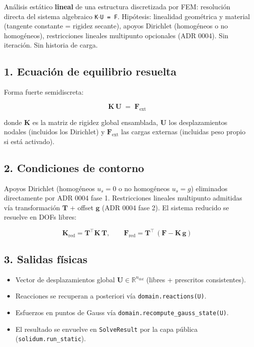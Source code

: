 \documentclass[11pt,letterpaper,oneside]{report}
\begin{document}
Análisis estático \textbf{lineal} de una estructura discretizada por FEM: resolución directa del sistema algebraico \texttt{K\ensuremath{\cdot}U = F}. Hipótesis: linealidad geométrica y material (tangente constante = rigidez secante), apoyos Dirichlet (homogéneos o no homogéneos), restricciones lineales multipunto opcionales (ADR 0004). Sin iteración. Sin historia de carga.

\subsection{1. Ecuación de equilibrio resuelta}

Forma fuerte semidiscreta:

\[
\mathbf K\,\mathbf U \;=\; \mathbf F_{\text{ext}}
\]

donde $\mathbf K$ es la matriz de rigidez global ensamblada, $\mathbf U$ los desplazamientos nodales (incluidos los Dirichlet) y $\mathbf F_{\text{ext}}$ las cargas externas (incluidas peso propio si está activado).

\subsection{2. Condiciones de contorno}

Apoyos Dirichlet (homogéneos $u_s = 0$ o no homogéneos $u_s = g$) eliminados directamente por ADR 0004 fase 1. Restricciones lineales multipunto admitidas vía transformación $\mathbf T$ + offset $\mathbf g$ (ADR 0004 fase 2). El sistema reducido se resuelve en DOFs libres:

\[
\mathbf K_{\text{red}} = \mathbf T^\top \mathbf K\,\mathbf T, \qquad \mathbf F_{\text{red}} = \mathbf T^\top\,(\mathbf F - \mathbf K\,\mathbf g)
\]

\subsection{3. Salidas físicas}

\begin{itemize}
  \item Vector de desplazamientos global $\mathbf U \in \mathbb R^{n_{\text{dof}}}$ (libres + prescritos consistentes).
  \item Reacciones se recuperan a posteriori vía \texttt{domain.reactions(U)}.
  \item Esfuerzos en puntos de Gauss vía \texttt{domain.recompute\_gauss\_state(U)}.
  \item El resultado se envuelve en \texttt{SolveResult} por la capa pública (\texttt{solidum.run\_static}).
\end{itemize}
\end{document}
